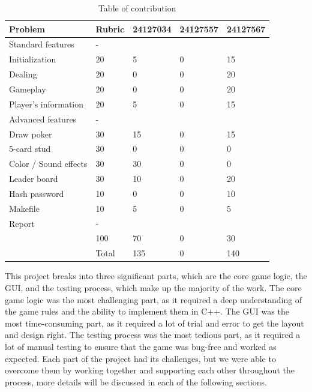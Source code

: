 \begin{table}[ht]
    \centering
    \begin{tabular}{|m{4cm}|m{2cm}|m{2cm}|m{2cm}| m{2cm}|}
    \hline
    \textbf{Problem} & \textbf{Rubric} & \textbf{24127034} & \textbf{24127557} & \textbf{24127567} \\
    \hline
    Standard features & - &  &  &  \\
    \hline
    Initialization & 20 & 5 & 0 & 15 \\
    \hline
    Dealing & 20 & 0 & 0 & 20 \\
    \hline 
    Gameplay & 20 & 0 & 0 & 20 \\
    \hline
    Player's information & 20 & 5 & 0 & 15 \\
    \hline
    Advanced features & - &  &  &  \\
    \hline 
    Draw poker & 30 & 15 & 0 & 15 \\
    \hline
    5-card stud & 30 & 0 & 0 & 0 \\
    \hline
    Color / Sound effects & 30 & 30 & 0 & 0 \\
    \hline
    Leader board & 30 & 10 & 0 & 20 \\
    \hline
    Hash password & 10 & 0 & 0 & 10 \\
    \hline
    Makefile & 10 & 5 & 0 & 5 \\
    \hline
    Report & - &  &  &  \\
    \hline
     & 100 & 70 & 0 & 30 \\
    \hline
    & Total & 135 & 0 & 140 \\
    \hline
    \end{tabular}
    \caption{Table of contribution}
    \label{tab:contribution-table}
\end{table}

\hspace{1cm} This project breaks into three significant parts, which are the core game logic, the GUI, and the testing process, which make up the majority of the work. The core game logic was the most challenging part, as it required a deep understanding of the game rules and the ability to implement them in C++. The GUI was the most time-consuming part, as it required a lot of trial and error to get the layout and design right. The testing process was the most tedious part, as it required a lot of manual testing to ensure that the game was bug-free and worked as expected. Each part of the project had its challenges, but we were able to overcome them by working together and supporting each other throughout the process, more details will be discussed in each of the following sections.

